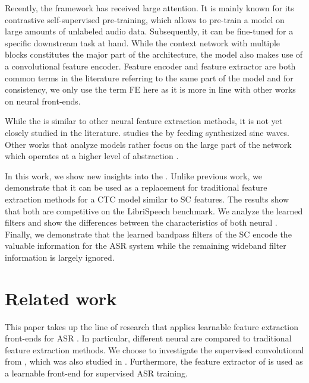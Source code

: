 \documentclass{INTERSPEECH2023}
\begin{document}
Recently, the \wvtwo framework \cite{facebook2020wav2vec2} has received large attention.
It is mainly known for its contrastive self-supervised pre-training, which allows to pre-train a model on large amounts of unlabeled audio data.
Subsequently, it can be fine-tuned for a specific downstream task at hand.
While the context network with multiple \transformer blocks constitutes the major part of the architecture, the \wvtwo model also makes use of a convolutional feature encoder.
Feature encoder \cite{facebook2020wav2vec2, facebook2020xlsr} and feature extractor \cite{asapp2022performance, vyas2022ondemand} are both common terms in the literature referring to the same part of the model and for consistency, we only use the term \acrfull{FE} here as it is more in line with other works on neural front-ends.

While the \wvtwo \fe is similar to other neural feature extraction methods, it is not yet closely studied in the literature.
\cite{choi2022w2v2fe} studies the \fe by feeding synthesized sine waves.
Other works that analyze \wvtwo models rather focus on the large \transformer part of the network which operates at a higher level of abstraction \cite{livescu2021wav2vec_analysis, fan21wvspeakerid, li2023exploration, dieck2022wav2vec}.

In this work, we show new insights into the \wvtwo \fe.
Unlike previous work, we demonstrate that it can be used as a replacement for traditional feature extraction methods for a \gls{CTC} model similar to \gls{SC} features.
The results show that both are competitive on the LibriSpeech benchmark.
We analyze the learned filters and show the differences between the characteristics of both neural \fes.
Finally, we demonstrate that the learned bandpass filters of the \gls{SC} \fe encode the valuable information for the \gls{ASR} system while the remaining wideband filter information is largely ignored.

\section{Related work}
This paper takes up the line of research that applies learnable feature extraction front-ends for \gls{ASR} \cite{palaz2015convolutional, golik15:cnn, tuske2018:waveform, ravanelli2018sincnet, sainath2015cldnn}.
In particular, different neural \fes are compared to traditional feature extraction methods.
We choose to investigate the supervised convolutional \fe from \cite{tuske2018:waveform}, which was also studied in \cite{vieting2021waveform}.
Furthermore, the feature extractor of \wvtwo \cite{facebook2020wav2vec2} is used as a learnable front-end for supervised \gls{ASR} training.
\end{document}
